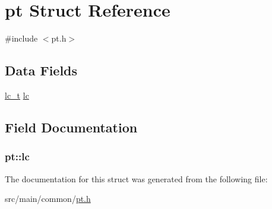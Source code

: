 \hypertarget{structpt}{\section{pt Struct Reference}
\label{structpt}
}


{\ttfamily \#include $<$pt.\+h$>$}

\subsection*{Data Fields}
\begin{DoxyCompactItemize}
\item 
\hyperlink{group__lc_ga2bdc4b7b4038454a79f1b2a94a6d2a98}{lc\+\_\+t} \hyperlink{structpt_ac3fa0fa86689e3e7c039a16c16861dbe}{lc}
\end{DoxyCompactItemize}


\subsection{Field Documentation}
\hypertarget{structpt_ac3fa0fa86689e3e7c039a16c16861dbe}{
\subsubsection[{lc}]{ pt\+::lc}}\label{structpt_ac3fa0fa86689e3e7c039a16c16861dbe}


The documentation for this struct was generated from the following file\+:\begin{DoxyCompactItemize}
\item 
src/main/common/\hyperlink{pt_8h}{pt.\+h}\end{DoxyCompactItemize}
